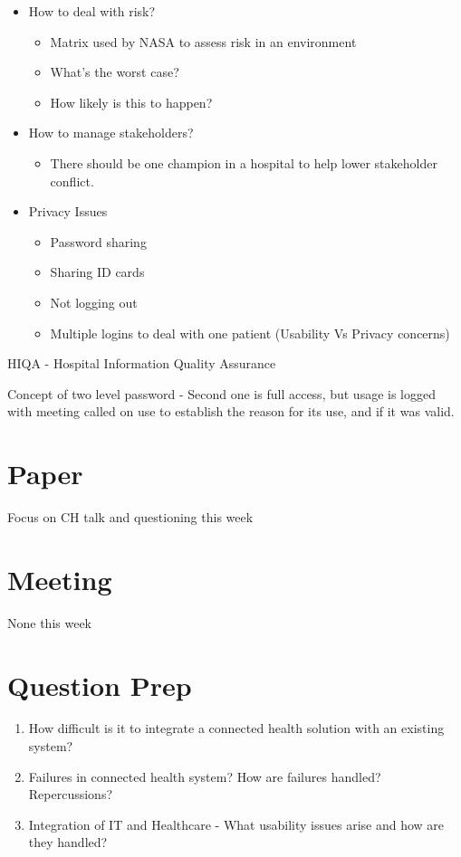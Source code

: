 \begin{itemize}

\item How to deal with risk?
\begin{itemize}
\item Matrix used by NASA to assess risk in an environment
\item What's the worst case?
\item How likely is this to happen?
\end{itemize}

\item How to manage stakeholders?
\begin{itemize}
\item There should be one champion in a hospital to help lower stakeholder conflict.
\end{itemize}

\item Privacy Issues
\begin{itemize}
\item Password sharing
\item Sharing ID cards
\item Not logging out
\item Multiple logins to deal with one patient (Usability Vs Privacy concerns)
\end{itemize}

\end{itemize}

HIQA - Hospital Information Quality Assurance

Concept of two level password - Second one is full access, but usage is logged with meeting called on use to establish the reason for its use, and if it was valid.

\section{Paper}

Focus on CH talk and questioning this week

\section{Meeting}

None this week

\section{Question Prep}
\begin{enumerate}
\item How difficult is it to integrate a connected health solution with an existing system?
\item Failures in connected health system? How are failures handled? Repercussions?
\item Integration of IT and Healthcare - What usability issues arise and how are they handled?
\end{enumerate}

